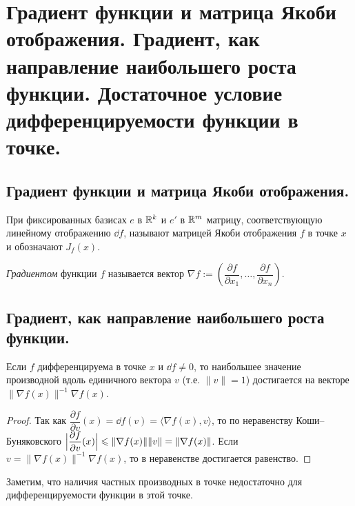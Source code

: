 \documentclass[a4paper]{article}
\theoremstyle{named}
\begin{document}
    \section{Градиент функции и матрица Якоби отображения. Градиент, как направление наибольшего роста функции. Достаточное условие дифференцируемости функции в точке.}

    \subsection{Градиент функции и матрица Якоби отображения.}

    \begin{definition*}
        При фиксированных базисах $e$ в $\RR^k$ и $e'$ в $\RR^m$ матрицу, соответствующую линейному отображению $\dd f$, называют матрицей Якоби отображения $f$ в точке $x$ и обозначают $J_f(x)$.
    \end{definition*}

    \begin{definition*}
        {\it Градиентом} функции $f$ называется вектор
        $\nabla f:=\left(\dfrac{\partial f}{\partial x_1},\ldots,\dfrac{\partial f}{\partial x_n}\right)$.
    \end{definition*}

    \subsection{Градиент, как направление наибольшего роста функции.}

    \begin{lemma*}
        Если $f$ дифференцируема в точке $x$ и $\dd f\ne0$, то наибольшее значение производной вдоль единичного вектора
        $v$ (т.е. $\|v\|=1$) достигается на векторе $\|\nabla f(x)\|^{-1}\nabla f(x)$.
    \end{lemma*}

    \begin{proof}
        Так как $\dfrac{\partial f}{\partial v}(x) = \dd f(v) = \langle\nabla f(x), v\rangle$,
        то по неравенству Коши--Буняковского $\Bigl|\dfrac{\partial f}{\partial v}(x)\Bigr|\leq \|\nabla f(x)\|\|v\|
        =\|\nabla f(x)\|$. Если $v=\|\nabla f(x)\|^{-1}\nabla f(x)$, то в неравенстве достигается равенство.
    \end{proof}

    Заметим, что наличия частных производных в точке недостаточно для дифференцируемости функции в этой точке.
\end{document}
